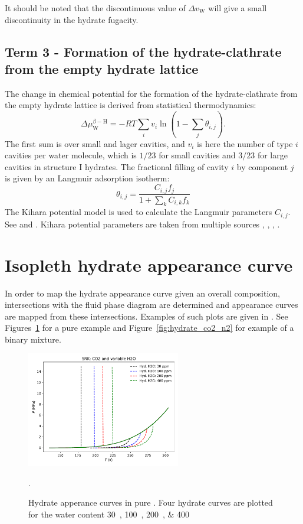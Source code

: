 \documentclass[english]{../thermomemo/thermomemo}
\newcommand{\hyd}{\text{H}}
\newcommand{\wat}{\text{W}}
\begin{document}
It should be noted that the discontinuous value of $\Delta v_\wat$ will
give a small discontinuity in the hydrate fugacity.

\subsection{Term 3 - Formation of the hydrate-clathrate from the empty
  hydrate lattice}
The change in chemical potential for the formation of the
hydrate-clathrate from the empty hydrate lattice is derived from
statistical thermodynamics:
\begin{equation}
  \label{eq:term3}
    \Delta \mu_\wat^{\beta - \hyd} = -RT \underset{i}{\sum}v_i \ln
    \left( 1- \underset{j}{\sum} \theta_{i,j} \right).
\end{equation}
The first sum is over small and lager cavities, and $v_i$ is here the number of
type $i$ cavities per water molecule, which is $1/23$ for small cavities
and $3/23$ for large cavities in structure I hydrates.
The fractional filling of cavity $i$ by component $j$ is given by an
Langmuir adsorption isotherm:
\begin{equation}
  \label{eq:theta}
    \theta_{i,j} = \frac{C_{i,j} f_j}{1 + \underset{k}{\sum} C_{i,k} f_k }
\end{equation}
The Kihara potential model is used to calculate the Langmuir
parameters $C_{i,j}$. See \citet{McKoy1963} and
\citet[Sec. 5.1.4]{Sloan2008}. Kihara potential parameters are taken from
multiple sources \citet{Sloan2008}, \citet{Avlonitis1994a},
\citet{Kalorazi1995}, \citet{Jager2013}.

\section{Isopleth hydrate appearance curve}
In order to map the hydrate appearance curve given an overall
composition, intersections with the fluid phase diagram are determined
and appearance curves are mapped from these intersections. Examples of
such plots are given in
. See
Figures~\ref{fig:hydrate_co2} for a pure  example and
Figure~\ref{fig:hydrate_co2_n2} for example of a binary mixture.

\begin{figure}[ht]
  \centering
  \includegraphics[width=0.6\textwidth]{hydrate_co2}
  \caption{Hydrate apperance curves in pure . Four hydrate
    curves are plotted for the water content
    \SIlist{30;100;200;400}{\ppm}}.
  \label{fig:hydrate_co2}
\end{figure}
\end{document}
